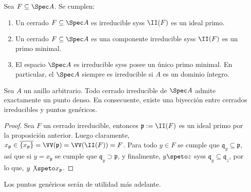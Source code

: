 \begin{prop}\label{thm:generic_in_spec}
	Sea $F \subseteq \Spec A$. Se cumplen:
	\begin{enumerate}
		\item Un cerrado $F \subseteq \Spec A$ es irreducible syss $\II(F)$ es un ideal primo.
		\item Un cerrado $F \subseteq \Spec A$ es una componente irreducible syss $\II(F)$ es un primo minimal.
		\item El espacio $\Spec A$ es irreducible syss posee un único primo minimal.
			En particular, el $\Spec A$ siempre es irreducible si $A$ es un dominio íntegro.
	\end{enumerate}
\end{prop}
\begin{cor}
	Sea $A$ un anillo arbitrario.
	Todo cerrado irreducible de $\Spec A$ admite exactamente un punto denso.
	En consecuente, existe una biyección entre cerrados irreducibles y puntos genéricos.
\end{cor}
\begin{proof}
	Sea $F$ un cerrado irreducible, entonces $\mathfrak{p} := \II(F)$ es un ideal primo por la proposición anterior.
	Luego claramente, $x_{\mathfrak{p}} \in \overline{\{ x_{\mathfrak{p}} \}} = \VV(\mathfrak{p}) = \VV(\II(F)) = F$.
	Para todo $y \in F$ se cumple que $\mathfrak{q}_y \subseteq \mathfrak{p}$, así que si $y = x_{\mathfrak{p}}$
	se cumple que $\mathfrak{q}_y \supset \mathfrak{p}$, y finalmente, $y \speto z$ syss $\mathfrak{q}_y \subseteq \mathfrak{q}_z$,
	por lo que, $y \not\speto x_{\mathfrak{p}}$.
\end{proof}
Los puntos genéricos serán de utilidad más adelante.



